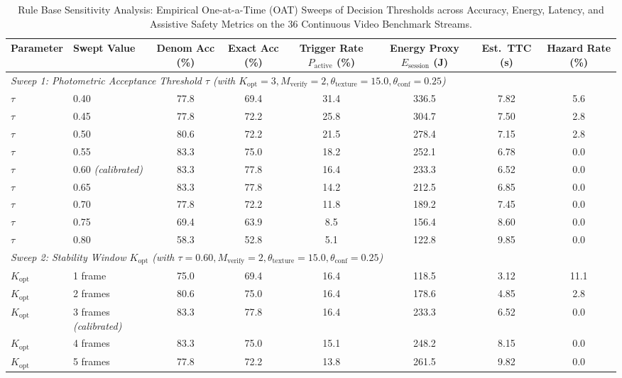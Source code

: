 \documentclass[final,5p,times,twocolumn,authoryear]{elsarticle}
\begin{document}
\begin{table}[t]
\centering
\caption{Rule Base Sensitivity Analysis: Empirical One-at-a-Time (OAT) Sweeps of Decision Thresholds across Accuracy, Energy, Latency, and Assistive Safety Metrics on the 36 Continuous Video Benchmark Streams.}
\label{tab:rule_sensitivity}
\scriptsize
\renewcommand{\arraystretch}{0.7}
\begin{tabular}{llcccccc}
\toprule
\textbf{Parameter} & \textbf{Swept Value} & \textbf{Denom Acc (\%)} & \textbf{Exact Acc (\%)} & \textbf{Trigger Rate $P_{\text{active}}$ (\%)} & \textbf{Energy Proxy $E_{\text{session}}$ (J)} & \textbf{Est.\ TTC (s)} & \textbf{Hazard Rate (\%)} \\
\midrule
\multicolumn{8}{l}{\textit{Sweep 1: Photometric Acceptance Threshold $\tau$ (with $K_{\text{opt}}=3, M_{\text{verify}}=2, \theta_{\text{texture}}=15.0, \theta_{\text{conf}}=0.25$)}} \\
$\tau$ & 0.40 & 77.8 & 69.4 & 31.4 & 336.5 & 7.82 & 5.6 \\
$\tau$ & 0.45 & 77.8 & 72.2 & 25.8 & 304.7 & 7.50 & 2.8 \\
$\tau$ & 0.50 & 80.6 & 72.2 & 21.5 & 278.4 & 7.15 & 2.8 \\
$\tau$ & 0.55 & 83.3 & 75.0 & 18.2 & 252.1 & 6.78 & 0.0 \\
$\tau$ & 0.60 \textit{(calibrated)} & 83.3 & 77.8 & 16.4 & 233.3 & 6.52 & 0.0 \\
$\tau$ & 0.65 & 83.3 & 77.8 & 14.2 & 212.5 & 6.85 & 0.0 \\
$\tau$ & 0.70 & 77.8 & 72.2 & 11.8 & 189.2 & 7.45 & 0.0 \\
$\tau$ & 0.75 & 69.4 & 63.9 & 8.5 & 156.4 & 8.60 & 0.0 \\
$\tau$ & 0.80 & 58.3 & 52.8 & 5.1 & 122.8 & 9.85 & 0.0 \\
\midrule
\multicolumn{8}{l}{\textit{Sweep 2: Stability Window $K_{\text{opt}}$ (with $\tau=0.60, M_{\text{verify}}=2, \theta_{\text{texture}}=15.0, \theta_{\text{conf}}=0.25$)}} \\
$K_{\text{opt}}$ & 1 frame & 75.0 & 69.4 & 16.4 & 118.5 & 3.12 & 11.1 \\
$K_{\text{opt}}$ & 2 frames & 80.6 & 75.0 & 16.4 & 178.6 & 4.85 & 2.8 \\
$K_{\text{opt}}$ & 3 frames \textit{(calibrated)} & 83.3 & 77.8 & 16.4 & 233.3 & 6.52 & 0.0 \\
$K_{\text{opt}}$ & 4 frames & 83.3 & 75.0 & 15.1 & 248.2 & 8.15 & 0.0 \\
$K_{\text{opt}}$ & 5 frames & 77.8 & 72.2 & 13.8 & 261.5 & 9.82 & 0.0 \\

\end{tabular}
\end{table}
\end{document}
